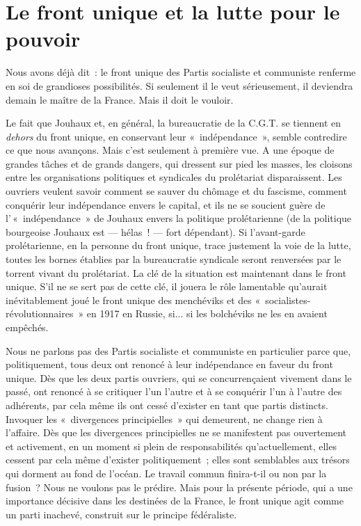 \documentclass[french,twoside]{book} %
\begin{document}
\section[{Le front unique et la lutte pour le pouvoir}]{Le front unique et la lutte pour le pouvoir}
\noindent Nous avons déjà dit : le front unique des Partis socialiste et communiste renferme en soi de grandioses possibilités. Si seulement il le veut sérieusement, il deviendra demain le maître de la France. Mais il doit le vouloir.\par
Le fait que Jouhaux et, en général, la bureaucratie de la C.G.T. se tiennent en \emph{dehors} du front unique, en conservant leur « indépendance », semble contredire ce que nous avançons. Mais c’est seulement à première vue. A une époque de grandes tâches et de grands dangers, qui dressent sur pied les masses, les cloisons entre les organisations politiques et syndicales du prolétariat disparaissent. Les ouvriers veulent savoir comment se sauver du chômage et du fascisme, comment conquérir leur indépendance envers le capital, et ils ne se soucient guère de l’ « indépendance » de Jouhaux envers la politique prolétarienne (de la politique bourgeoise Jouhaux est — hélas ! — fort dépendant). Si l’avant-garde prolétarienne, en la personne du front unique, trace justement la voie de la lutte, toutes les bornes établies par la bureaucratie syndicale seront renversées par le torrent vivant du prolétariat. La clé de la situation est maintenant dans le front unique. S’il  ne se sert pas de cette clé, il jouera le rôle lamentable qu’aurait inévitablement joué le front unique des menchéviks et des « socialistes-révolutionnaires » en 1917 en Russie, si... si les bolchéviks ne les en avaient empêchés.\par
Nous ne parlons pas des Partis socialiste et communiste en particulier parce que, politiquement, tous deux ont renoncé à leur indépendance en faveur du front unique. Dès que les deux partis ouvriers, qui se concurrençaient vivement dans le passé, ont renoncé à se critiquer l’un l’autre et à se conquérir l’un à l’autre des adhérents, par cela même ils ont cessé d’exister en tant que partis distincts. Invoquer les « divergences principielles » qui demeurent, ne change rien à l’affaire. Dès que les divergences principielles ne se manifestent pas ouvertement et activement, en un moment si plein de responsabilités qu’actuellement, elles cessent par cela même d’exister politiquement ; elles sont semblables aux trésors qui dorment au fond de l’océan. Le travail commun finira-t-il ou non par la fusion ? Nous ne voulons pas le prédire. Mais pour la présente période, qui a une importance décisive dans les destinées de la France, le front unique agit comme un parti inachevé, construit sur le principe fédéraliste.\par
\end{document}
